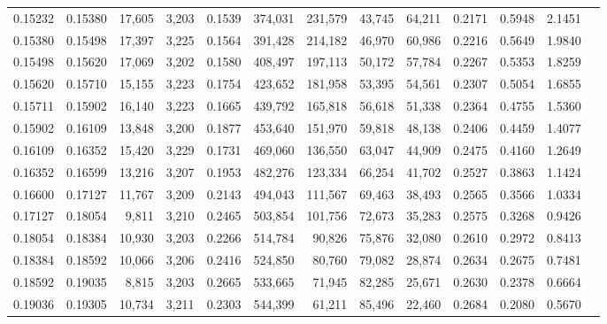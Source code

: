 \begin{tabular}{rrrrrrrrrrrrr}
0.15232 & 0.15380 & 17,605 & 3,203 &                                     0.1539 & 374,031 & 231,579 &  43,745 &  64,211 & 0.2171 & 0.5948 & 2.1451 \\
0.15380 & 0.15498 & 17,397 & 3,225 &                                     0.1564 & 391,428 & 214,182 &  46,970 &  60,986 & 0.2216 & 0.5649 & 1.9840 \\
0.15498 & 0.15620 & 17,069 & 3,202 &                                     0.1580 & 408,497 & 197,113 &  50,172 &  57,784 & 0.2267 & 0.5353 & 1.8259 \\
0.15620 & 0.15710 & 15,155 & 3,223 &                                     0.1754 & 423,652 & 181,958 &  53,395 &  54,561 & 0.2307 & 0.5054 & 1.6855 \\
0.15711 & 0.15902 & 16,140 & 3,223 &                                     0.1665 & 439,792 & 165,818 &  56,618 &  51,338 & 0.2364 & 0.4755 & 1.5360 \\
0.15902 & 0.16109 & 13,848 & 3,200 &                                     0.1877 & 453,640 & 151,970 &  59,818 &  48,138 & 0.2406 & 0.4459 & 1.4077 \\
0.16109 & 0.16352 & 15,420 & 3,229 &                                     0.1731 & 469,060 & 136,550 &  63,047 &  44,909 & 0.2475 & 0.4160 & 1.2649 \\
0.16352 & 0.16599 & 13,216 & 3,207 &                                     0.1953 & 482,276 & 123,334 &  66,254 &  41,702 & 0.2527 & 0.3863 & 1.1424 \\
0.16600 & 0.17127 & 11,767 & 3,209 &                                     0.2143 & 494,043 & 111,567 &  69,463 &  38,493 & 0.2565 & 0.3566 & 1.0334 \\
0.17127 & 0.18054 &  9,811 & 3,210 &                                     0.2465 & 503,854 & 101,756 &  72,673 &  35,283 & 0.2575 & 0.3268 & 0.9426 \\
0.18054 & 0.18384 & 10,930 & 3,203 &                                     0.2266 & 514,784 &  90,826 &  75,876 &  32,080 & 0.2610 & 0.2972 & 0.8413 \\
0.18384 & 0.18592 & 10,066 & 3,206 &                                     0.2416 & 524,850 &  80,760 &  79,082 &  28,874 & 0.2634 & 0.2675 & 0.7481 \\
0.18592 & 0.19035 &  8,815 & 3,203 &                                     0.2665 & 533,665 &  71,945 &  82,285 &  25,671 & 0.2630 & 0.2378 & 0.6664 \\
0.19036 & 0.19305 & 10,734 & 3,211 &                                     0.2303 & 544,399 &  61,211 &  85,496 &  22,460 & 0.2684 & 0.2080 & 0.5670 \\

\end{tabular}
